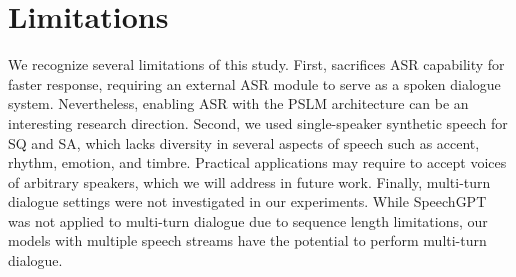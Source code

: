 \section{Limitations}
We recognize several limitations of this study.
First, \prop sacrifices ASR capability for faster response, requiring an external ASR module to serve as a spoken dialogue system.
Nevertheless, enabling ASR with the PSLM architecture can be an interesting research direction.
Second, we used single-speaker synthetic speech for SQ and SA, which lacks diversity in several aspects of speech such as accent, rhythm, emotion, and timbre.
Practical applications may require to accept voices of arbitrary speakers, which we will address in future work.
Finally, multi-turn dialogue settings were not investigated in our experiments.
While SpeechGPT~\citep{zhang-etal-2023-speechgpt} was not applied to multi-turn dialogue due to sequence length limitations, our models with multiple speech streams have the potential to perform multi-turn dialogue.

